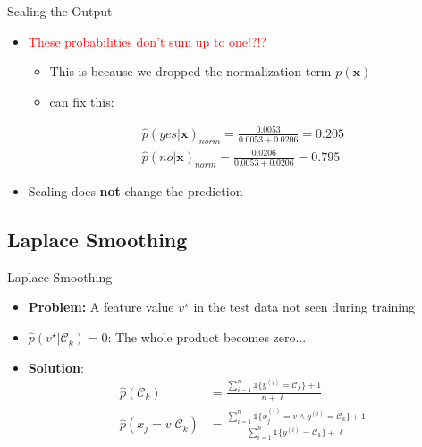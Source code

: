 \begin{frame}{Scaling the Output}{}
	\begin{itemize}
		\item {} \textcolor{red}{These probabilities don't sum up to one!?!?}
		\begin{itemize}
			\item This is because we dropped the normalization term $p(\bm{x})$
			\item {} can fix this:
		\end{itemize}
		\begin{align*}
			\widehat{p}(yes \vert \bm{x})_{norm} = \frac{0.0053}{0.0053 + 0.0206} = \bm{0.205} 	\\[3mm]
			\widehat{p}(no \vert \bm{x})_{norm} = \frac{0.0206}{0.0053 + 0.0206} = \bm{0.795}
		\end{align*}
		\item Scaling does \textbf{not} change the prediction
	\end{itemize}
\end{frame}


\subsection{Laplace Smoothing}

\begin{frame}{Laplace Smoothing}{}
	\begin{itemize}
		\item \textbf{Problem:} A feature value $v^{\star}$ in the test data not seen during training
		\item $\widehat{p}(v^{\star} \vert \mathcal{C}_k) = 0$: The whole product becomes zero...
		\item \textbf{Solution}: 
		\begin{align}
			\widehat{p}(\mathcal{C}_k)
				&= \frac{\sum_{i=1}^n \mathbb{1}\{ y^{(i)} = \mathcal{C}_k \} + 1} {n + \ell} \\[3mm]
			\widehat{p}(x_j = v \vert \mathcal{C}_k)
				&= \frac{\sum_{i=1}^n \mathbb{1}\{ x_j^{(i)} = v \wedge y^{(i)} = \mathcal{C}_k \} + 1}
					{\sum_{i=1}^n \mathbb{1}\{ y^{(i)} = \mathcal{C}_k \} + \ell}
		\end{align}
	\end{itemize}
\end{frame}


